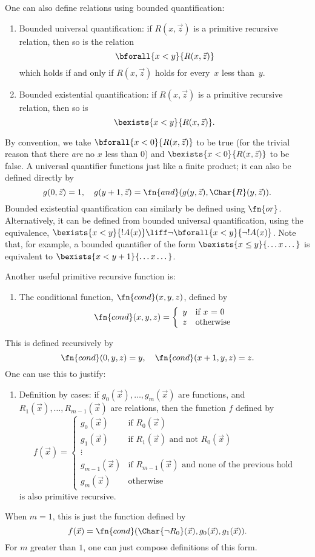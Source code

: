 \documentclass[../../../include/open-logic-section]{subfiles}
\begin{document}
One can also define relations using bounded quantification:
\begin{enumerate}
\item Bounded universal quantification: if $R(x, \vec z)$ is a
primitive recursive relation, then so is the relation
\[
\bforall{x < y}{R(x, \vec z)}
\]
which holds if and only if $R(x,\vec z)$ holds for every~$x$ less
than~$y$.
\item Bounded existential quantification: if $R(x, \vec z)$ is a
primitive recursive relation, then so is
\[
\bexists{x < y}{R(x, \vec z)}.
\]
\end{enumerate}
By convention, we take $\bforall{x < 0}{R(x,\vec z)}$ to be true (for
the trivial reason that there \emph{are} no $x$ less than $0$) and
$\bexists{x < 0}{R(x,\vec z)}$ to be false. A universal quantifier
functions just like a finite product; it can also be defined directly
by
\[
g(0,\vec z) = 1, \quad g(y+1,\vec z) =
\fn{and}(g(y,\vec z),\Char{R}(y,\vec z)).
\]
Bounded existential quantification can similarly be defined using
$\fn{or}$. Alternatively, it can be defined from bounded universal
quantification, using the equivalence, $\bexists{x < y}{!A(x)} \liff
\lnot \bforall{x < y}{\lnot !A(x)}$. Note that, for example, a bounded
quantifier of the form $\bexists{x \leq y}{\dots x\dots}$ is
equivalent to $\bexists{x < y+1}{\dots x \dots}$.

Another useful primitive recursive function is:
\begin{enumerate}
\item The conditional function, $\fn{cond}(x,y,z)$, defined by
\[
\fn{cond}(x,y,z) = \left\{ \begin{array}{ll}
  y & \mbox{if $x$ = 0} \\
  z & \mbox{otherwise}
\end{array}\right.
\]
\end{enumerate}
This is defined recursively by
\[
\fn{cond}(0,y,z) = y, \quad \fn{cond}(x+1,y,z) = z.
\]
One can use this to justify:
\begin{enumerate}
\item Definition by cases: if $g_0(\vec x), \dots, g_m(\vec x)$ are
functions, and $R_1(\vec x), \dots, R_{m-1}(\vec x)$ are relations, then
the function $f$ defined by
\[
f(\vec x) = \left\{\begin{array}{ll}
    g_0(\vec x) & \mbox{if $R_0(\vec{x})$} \\
    g_1(\vec x) & \mbox{if $R_1(\vec{x})$ and not $R_0(\vec{x})$} \\
    \vdots & \\
    g_{m-1}(\vec x) & \mbox{if $R_{m-1}(\vec{x})$ and none of the
      previous hold}
    \\
    g_m(\vec x) & \mbox{otherwise}
\end{array}\right.
\]
is also primitive recursive.
\end{enumerate}
When $m = 1$, this is just the function defined by
\[
f(\vec x) = \fn{cond}(\Char{\lnot R_0}(\vec x),g_0(\vec x),g_1(\vec
 x)).
\]
For $m$ greater than $1$, one can just compose definitions of this
form.
\end{document}
